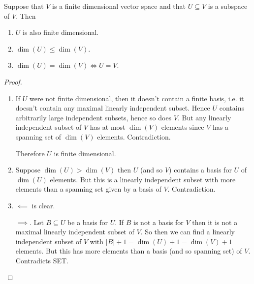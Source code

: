 \documentclass[10pt, a4paper]{article}
\begin{document}
\begin{theorem}
    Suppose that $V$ is a finite dimensional vector space and that $U \subseteq V$ is a subspace of $V$.
    Then
    \begin{enumerate}[label = (\roman*)]
        \item $U$ is also finite dimensional.
        \item $\dim(U) \leq \dim(V)$.
        \item $\dim(U) = \dim(V) \iff U = V$.
    \end{enumerate}
    \begin{proof}\phantom{}
        \begin{enumerate}[label = (\roman*)]
            \item If $U$ were not finite dimensional,
            then it doesn't contain a finite basis,
            i.e. it doesn't contain any maximal linearly independent subset.
            Hence $U$ contains arbitrarily large independent subsets,
            hence so does $V$.
            But any linearly independent subset of $V$ has at most $\dim(V)$ elements since $V$ has a spanning set of $\dim(V)$ elements. Contradiction.
            
            Therefore $U$ is finite dimensional.
            \item Suppose $\dim(U) > \dim(V)$ then $U$
            (and so $V$)
            contains a basis for $U$ of $\dim(U)$ elements.
            But this is a linearly independent subset with more elements than a spanning set given by a basis of $V$. Contradiction.
            \item
            $\impliedby$ is clear.
            
            $\implies$.
            Let $B \subseteq U$ be a basis for $U$.
            If $B$ is not a basis for $V$ then it is not a maximal linearly independent subset of $V$.
            So then we can find a linearly independent subset of $V$ with $|B|+ 1 = \dim(U) + 1 = \dim(V) + 1$ elements.
            But this has more elements than a basis
            (and so spanning set)
            of $V$.
            Contradicts SET.
        \end{enumerate}
    \end{proof}
\end{theorem}
\end{document}
